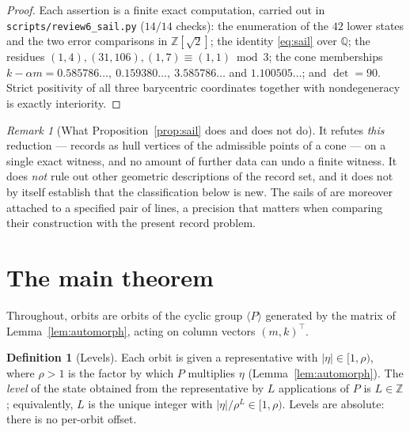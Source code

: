 \documentclass[11pt]{article}
\theoremstyle{definition}
\newtheorem{definition}[theorem]{Definition}
\theoremstyle{remark}
\newtheorem{remark}[theorem]{Remark}
\newcommand{\Z}{\mathbb{Z}}
\newcommand{\Q}{\mathbb{Q}}
\begin{document}
\begin{proof}
Each assertion is a finite exact computation, carried out in
\texttt{scripts/review6\_sail.py} ($14/14$ checks): the enumeration of the $42$ lower states
and the two error comparisons in $\Z[\sqrt2]$; the identity \eqref{eq:sail} over $\Q$; the
residues $(1,4),(31,106),(1,7)\equiv(1,1)\bmod3$; the cone memberships
$k-\alpha m=0.585786\ldots,\ 0.159380\ldots,\ 3.585786\ldots$ and $1.100505\ldots$; and
$\det=90$. Strict positivity of all three barycentric coordinates together with
nondegeneracy is exactly interiority.
\end{proof}

\begin{remark}[What Proposition~\ref{prop:sail} does and does not do]\label{rem:sailscope}
It refutes \emph{this} reduction --- records as hull vertices of the admissible points of a
cone --- on a single exact witness, and no amount of further data can undo a finite witness. It
does \emph{not} rule out other geometric descriptions of the record set, and it does not by
itself establish that the classification below is new. The sails of \cite{SpaldingVeselov} are
moreover attached to a specified pair of lines, a precision that matters when comparing their
construction with the present record problem.
\end{remark}

\section{The main theorem}\label{sec:main}

Throughout, orbits are orbits of the cyclic group $\langle P\rangle$ generated by the matrix of
Lemma~\ref{lem:automorph}, acting on column vectors $(m,k)^{\!\top}$.

\begin{definition}[Levels]\label{def:level}
Each orbit is given a representative with $|\eta|\in[1,\rho)$, where $\rho>1$ is the factor by
which $P$ multiplies $\eta$ (Lemma~\ref{lem:automorph}). The \emph{level} of the state obtained
from the representative by $L$ applications of $P$ is $L\in\Z$; equivalently, $L$ is the unique
integer with $|\eta|/\rho^{L}\in[1,\rho)$. Levels are absolute: there is no per-orbit offset.
\end{definition}
\end{document}

